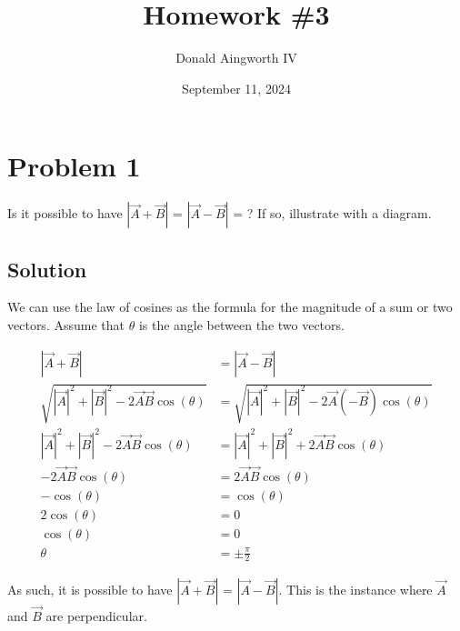 \documentclass[12pt]{article}
\title{Homework \#3}
\author{Donald Aingworth IV}
\date{September 11, 2024}
\begin{document}

\maketitle

\section*{Problem 1}
Is it possible to have $|\Vec{A} + \Vec{B}|$ = $|\Vec{A} - \Vec{B}|$ = ? If so, illustrate with a diagram.

\subsection*{Solution}
We can use the law of cosines as the formula for the magnitude of a sum or two vectors. Assume that $\theta$ is the angle between the two vectors.

\begin{align*}
    |\Vec{A} + \Vec{B}| &= |\Vec{A} - \Vec{B}|\\
    \sqrt{|\Vec{A}|^2 + |\Vec{B}|^2 - 2\Vec{A}\Vec{B}\cos(\theta)} &= \sqrt{|\Vec{A}|^2 + |\Vec{B}|^2 - 2\Vec{A}(-\Vec{B})\cos(\theta)}\\
    |\Vec{A}|^2 + |\Vec{B}|^2 - 2\Vec{A}\Vec{B}\cos(\theta) &= |\Vec{A}|^2 + |\Vec{B}|^2 + 2\Vec{A}\Vec{B}\cos(\theta)\\
    - 2\Vec{A}\Vec{B}\cos(\theta) &= 2\Vec{A}\Vec{B}\cos(\theta)\\
    -\cos(\theta) &= \cos(\theta)\\
    2\cos(\theta) &= 0\\
    \cos(\theta) &= 0\\
    \theta &= \pm \frac{\pi}{2}
\end{align*}

As such, it is possible to have $|\Vec{A} + \Vec{B}|$ = $|\Vec{A} - \Vec{B}|$. This is the instance where $\Vec{A}$ and $\Vec{B}$ are perpendicular. 

\end{document}

